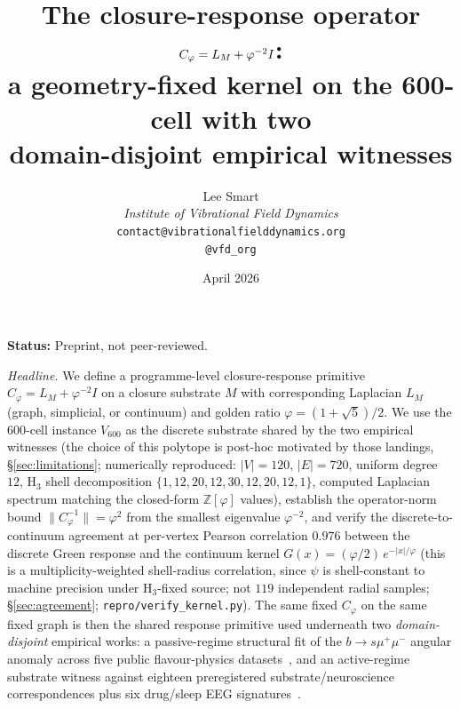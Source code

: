 \documentclass[11pt]{article}
\title{The closure-response operator
       $\Cph = L_M + \Ph^{-2} I$:\\
       a geometry-fixed kernel on the 600-cell with two\\
       domain-disjoint empirical witnesses}
\author{%
  Lee Smart\\[2pt]
  \textit{Institute of Vibrational Field Dynamics}\\[2pt]
  \texttt{contact@vibrationalfielddynamics.org}\\[2pt]
  \texttt{@vfd\_org}%
}
\date{April 2026}
\newcommand{\Ph}{\varphi}
\newcommand{\Cph}{C_{\Ph}}
\newcommand{\Rsixhundred}{V_{600}}
\begin{document}
\maketitle

\noindent\textbf{Status:} Preprint, not peer-reviewed.

\noindent\emph{Headline.}
We define a programme-level closure-response primitive
$\Cph = L_M + \Ph^{-2} I$ on a closure substrate $M$ with
corresponding Laplacian $L_M$ (graph, simplicial, or continuum)
and golden ratio $\Ph = (1 + \sqrt{5})/2$. We use
the 600-cell instance $\Rsixhundred$ as the discrete substrate
shared by the two empirical witnesses (the choice of this polytope
is post-hoc motivated by those landings, \S\ref{sec:limitations};
numerically reproduced: $|V|=120$, $|E|=720$, uniform
degree~$12$, H$_3$ shell decomposition
$\{1,12,20,12,30,12,20,12,1\}$, computed Laplacian spectrum
matching the closed-form $\mathbb{Z}[\Ph]$ values), establish the
operator-norm bound $\|\Cph^{-1}\| = \Ph^{2}$ from the smallest
eigenvalue $\Ph^{-2}$, and verify the discrete-to-continuum
agreement at per-vertex Pearson correlation $0.976$ between the
discrete Green response and the continuum kernel
$G(x) = (\Ph/2)\,e^{-|x|/\Ph}$ (this is a multiplicity-weighted
shell-radius correlation, since $\psi$ is shell-constant to
machine precision under H$_3$-fixed source; not $119$ independent
radial samples; \S\ref{sec:agreement};
\texttt{repro/verify\_kernel.py}). The same fixed $\Cph$ on the
same fixed graph is then the shared response primitive used
underneath two \emph{domain-disjoint} empirical works: a passive-regime structural
fit of the $b\to s\mu^{+}\mu^{-}$ angular anomaly across five
public flavour-physics datasets~\citep{SmartBAnomaly2026}, and an
active-regime substrate witness against eighteen preregistered
substrate/neuroscience correspondences plus six drug/sleep EEG
signatures~\citep{SmartAriaChess2026}.
\end{document}

